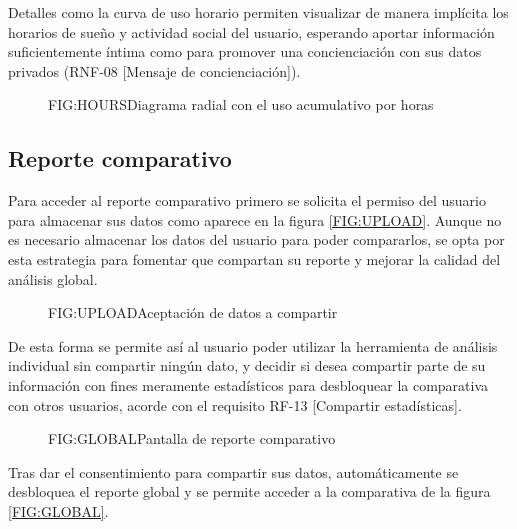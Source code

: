 Detalles como la curva de uso horario permiten visualizar de manera implícita los horarios de sueño y actividad social del usuario, esperando aportar información suficientemente íntima como para promover una concienciación con sus datos privados (RNF-08 [Mensaje de concienciación]).

\begin{figure}[Reporte de uso acumulativo por horas]{FIG:HOURS}{Diagrama radial con el uso acumulativo por horas}
\end{figure}

\subsection{Reporte comparativo}

Para acceder al reporte comparativo primero se solicita el permiso del usuario para almacenar sus datos como aparece en la figura \ref{FIG:UPLOAD}. Aunque no es necesario almacenar los datos del usuario para poder compararlos, se opta por esta estrategia para fomentar que compartan su reporte y mejorar la calidad del análisis global.

\begin{figure}[Pantalla de consentimiento de datos]{FIG:UPLOAD}{Aceptación de datos a compartir}
\end{figure}

De esta forma se permite así al usuario poder utilizar la herramienta de análisis individual sin compartir ningún dato, y decidir si desea compartir parte de su información con fines meramente estadísticos para desbloquear la comparativa con otros usuarios, acorde con el requisito RF-13 [Compartir estadísticas].

\begin{figure}[Pantalla de métricas comparativas]{FIG:GLOBAL}{Pantalla de reporte comparativo}
\end{figure}

Tras dar el consentimiento para compartir sus datos, automáticamente se desbloquea el reporte global y se permite acceder a la comparativa de la figura \ref{FIG:GLOBAL}.

\newpage
